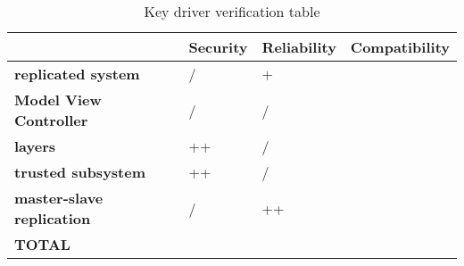\begin{table}[H]
    \begin{tabularx}{\textwidth}{p{3.5cm}|>{\centering\arraybackslash}X|>{\centering\arraybackslash}X|>{\centering\arraybackslash}X}
    	 & \textbf{Security} & \textbf{Reliability} & \textbf{Compatibility} \\ \hline
    	\textbf{replicated system}         & /  & +  &  \\ \hline
    	\textbf{Model View Controller}  & /  & / &   \\ \hline
    	\textbf{layers}                    & ++ & /  &   \\ \hline
    	\textbf{trusted subsystem}         & ++ & /  &   \\ \hline
    	\textbf{master-slave replication}  & /  & ++ &   \\ \hline
	 \textbf{TOTAL} & \textbf{} & \textbf{} & \textbf{} \\
    \end{tabularx}
    \caption{Key driver verification table}
\end{table}
